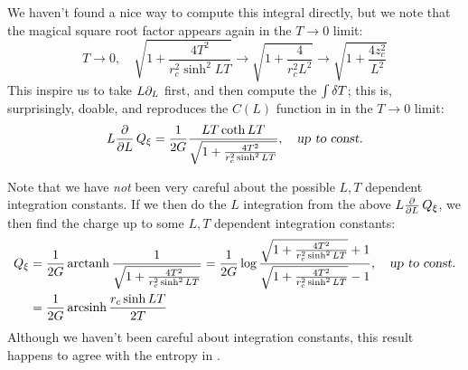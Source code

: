 \documentclass[11pt,a4paper]{article}
\begin{document}
	We haven't found a nice way to compute this integral directly, but we note that the magical square root factor appears again in the $T\to 0$ limit:
	\begin{equation}
		T\to 0,
	\quad
		\sqrt{
			1 + \frac{4T^2}{r_c^2 \sinh^2 LT}
		}
		\to \sqrt{
			1 + \frac{4}{r_c^2 L^2}
		}
		\to \sqrt{
			1 + \frac{4z_c^2}{L^2}
		}
	\end{equation}
	This inspire us to take $L\partial_{L}$ first, and then compute the $\int \var{T}$; this is, surprisingly, doable, and reproduces the $C(L)$ function in \textcite{Lewkowycz:2019xse} in the $T \to 0$ limit:
	\begin{equation}
		L \pdv{L}\,Q_\xi
		= \frac{1}{2G}
			\frac{LT \coth LT}{\sqrt{
				1 + \frac{4T^2}{r_c^2 \sinh^2 LT}
			}},
	\quad\textsl{up to const.}
	\end{equation}
	
	Note that we have \textit{not} been very careful about the possible $L,T$ dependent integration constants. If we then do the $L$ integration from the above $L \pdv{L}\,Q_\xi$, we then find the charge up to some $L,T$ dependent integration constants:
	\begin{equation}
	\begin{aligned}
		Q_\xi
		&= \frac{1}{2G} \operatorname{arctanh}
			\frac{1}{\sqrt{
				1 + \frac{4T^2}{r_c^2 \sinh^2 LT}
			}}
		= \frac{1}{2G} \log
			\frac{
				\sqrt{
					1 + \frac{4T^2}{r_c^2 \sinh^2 LT}
				} + 1
			}{
				\sqrt{
					1 + \frac{4T^2}{r_c^2 \sinh^2 LT}
				} - 1
			},
	\quad\textsl{up to const.} \\
		&= \frac{1}{2G} \operatorname{arcsinh}
			\frac{r_c \sinh LT}{2T}
	\end{aligned}
	\end{equation}
	Although we haven't been careful about integration constants, this result happens to agree with the entropy in \cite{Lewkowycz:2019xse}. 
	
	
	

\FloatBarrier

\pagebreak

 





\end{document}
